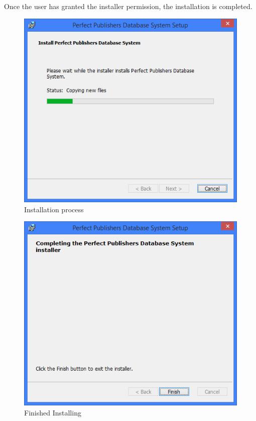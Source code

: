 Once the user has granted the installer permission, the installation is completed.

\begin{figure}[H]
    \includegraphics[width=\textwidth]{./Manual/Installation/Installing.png}
    \caption{Installation process}
\end{figure}

\begin{figure}[H]
    \includegraphics[width=\textwidth]{./Manual/Installation/Installed.png}
    \caption{Finished Installing}
\end{figure}


